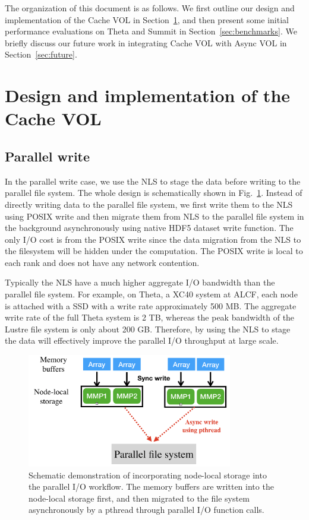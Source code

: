 \documentclass[aps, prb, 11pt, notitlepage]{revtex4-1}
\begin{document}
The organization of this document is as follows. We first outline our design and implementation of the Cache VOL in Section~\ref{sec:design}, and then present some initial performance evaluations on Theta and Summit in Section~\ref{sec:benchmarks}. We briefly discuss our future work in integrating Cache VOL with Async VOL in Section~\ref{sec:future}.
\section{Design and implementation of the Cache VOL} \label{sec:design}
\subsection{Parallel write}
In the parallel write case, we use the NLS to stage the data before writing to the parallel file system. The whole design is schematically shown in Fig.~\ref{fig:schematic}. Instead of directly writing data to the parallel file system, we first write them to the NLS using POSIX write and then migrate them from NLS to the parallel file system in the background asynchronously using native HDF5 dataset write function. The only I/O cost is from the POSIX write since the data migration from the NLS to the filesystem will be hidden under the computation. The POSIX write is local to each rank and does not have any network contention. 

Typically the NLS have a much higher aggregate I/O bandwidth than the parallel file system. For example, on Theta, a XC40 system at ALCF, each node is attached with a SSD with a write rate approximately 500 MB. The aggregate write rate of the full Theta system is 2 TB, whereas the peak bandwidth of the Lustre file system is only about 200 GB. Therefore, by using the NLS to stage the data will effectively improve the parallel I/O throughput at large scale. 
\begin{figure}[hbt]
\centering
\includegraphics[width=0.8\textwidth]{schematic.png}
\caption{Schematic demonstration of incorporating node-local storage into the parallel I/O workflow. The memory buffers are written into the node-local storage first, and then migrated to the file system asynchronously by a pthread through parallel I/O function calls.}\label{fig:schematic}
\end{figure} 
\end{document}
